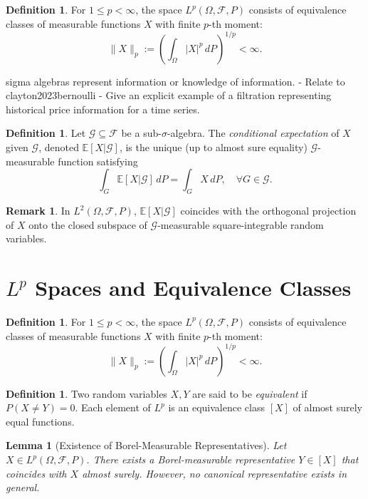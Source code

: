 \documentclass[11pt,reqno]{amsart}
\newtheorem{lemma}[theorem]{Lemma}
\theoremstyle{definition}
\newtheorem{definition}[theorem]{Definition}
\newtheorem{remark}[theorem]{Remark}
\theoremstyle{remark}
\begin{document}
\begin{definition}
	For $1 \leq p < \infty$, the space $L^p(\Omega, \mathcal{F}, P)$ consists of equivalence classes of measurable functions $X$ with finite $p$-th moment:
	\[
		\|X\|_p := \left( \int_\Omega |X|^p \, dP \right)^{1/p} < \infty.
	\]
\end{definition}



sigma algebras represent information or knowledge of information.
- Relate to clayton2023bernoulli
- Give an explicit example of a filtration representing historical price information for a time series.

\begin{definition}
	Let $\mathcal{G} \subseteq \mathcal{F}$ be a sub-$\sigma$-algebra. The \emph{conditional expectation} of $X$ given $\mathcal{G}$, denoted $\mathbb{E}[X|\mathcal{G}]$, is the unique (up to almost sure equality) $\mathcal{G}$-measurable function satisfying
	\[
		\int_G \mathbb{E}[X|\mathcal{G}] \, dP = \int_G X \, dP, \quad \forall G \in \mathcal{G}.
	\]
\end{definition}

\begin{remark}
	In $L^2(\Omega, \mathcal{F}, P)$, $\mathbb{E}[X|\mathcal{G}]$ coincides with the orthogonal projection of $X$ onto the closed subspace of $\mathcal{G}$-measurable square-integrable random variables.
\end{remark}

\section{\texorpdfstring{$L^p$}{Lp} Spaces and Equivalence Classes}

\begin{definition}
	For $1 \leq p < \infty$, the space $L^p(\Omega, \mathcal{F}, P)$ consists of equivalence classes of measurable functions $X$ with finite $p$-th moment:
	\[
		\|X\|_p := \left( \int_\Omega |X|^p \, dP \right)^{1/p} < \infty.
	\]
\end{definition}

\begin{definition}
	Two random variables $X, Y$ are said to be \emph{equivalent} if $P(X \neq Y)=0$. Each element of $L^p$ is an equivalence class $[X]$ of almost surely equal functions.
\end{definition}

\begin{lemma}[Existence of Borel-Measurable Representatives]
	Let $X \in L^p(\Omega, \mathcal{F}, P)$. There exists a Borel-measurable representative $Y \in [X]$ that coincides with $X$ almost surely. However, no canonical representative exists in general.
\end{lemma}
\end{document}
